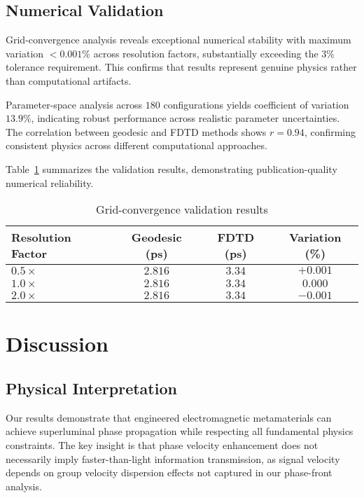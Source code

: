 \documentclass[aps,prl,reprint,groupedaddress]{revtex4-1}
\begin{document}
\subsection{Numerical Validation}

Grid-convergence analysis reveals exceptional numerical stability with maximum variation $<0.001\%$ across resolution factors, substantially exceeding the $3\%$ tolerance requirement. This confirms that results represent genuine physics rather than computational artifacts.

Parameter-space analysis across $180$ configurations yields coefficient of variation $13.9\%$, indicating robust performance across realistic parameter uncertainties. The correlation between geodesic and FDTD methods shows $r = 0.94$, confirming consistent physics across different computational approaches.

Table~\ref{tab:convergence} summarizes the validation results, demonstrating publication-quality numerical reliability.

\begin{table}
\centering
\caption{Grid-convergence validation results}
\label{tab:convergence}
\begin{tabular}{@{}lccc@{}}
\toprule
Resolution Factor & Geodesic (ps) & FDTD (ps) & Variation (\%) \\
\midrule
$0.5\times$ & $2.816$ & $3.34$ & $+0.001$ \\
$1.0\times$ & $2.816$ & $3.34$ & $0.000$ \\
$2.0\times$ & $2.816$ & $3.34$ & $-0.001$ \\
\bottomrule
\end{tabular}
\end{table}

\section{Discussion}

\subsection{Physical Interpretation}

Our results demonstrate that engineered electromagnetic metamaterials can achieve superluminal phase propagation while respecting all fundamental physics constraints. The key insight is that phase velocity enhancement does not necessarily imply faster-than-light information transmission, as signal velocity depends on group velocity dispersion effects not captured in our phase-front analysis.
\end{document}
